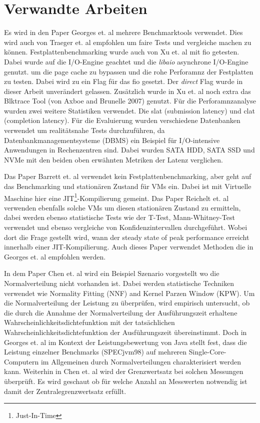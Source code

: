 \chapter{Verwandte Arbeiten}
\label{cha:Verwandte_Arbeiten}

Es wird in den Paper Georges et. al \cite{statistically_rigorous} mehrere Benchmarktools verwendet. 
Dies wird auch von Traeger et. al \cite{nine-year-of-bench} empfohlen um faire Tests und vergleiche machen zu können.
Festplattenbenchmarking wurde auch von Xu et. al \cite{ssd_benchmark} mit fio getesten.
Dabei wurde auf die I/O-Engine geachtet und die \textit{libaio} asynchrone I/O-Engine genutzt.
um die page cache zu bypassen und die rohe Perforamnz der Festplatten zu testen.
Dabei wird zu ein Flag für das fio gesetzt.
Der \textit{direct} Flag wurde in dieser Arbeit unverändert gelassen.
Zusätzlich wurde in Xu et. al \cite{ssd_benchmark} noch extra das Blktrace Tool (von Axboe and Brunelle 2007) genutzt. 
Für die Perforamnzanalyse wurden zwei weitere Statistiken verwendet. Die slat (submission latency) und clat (completion latency).
Für die Evaluierung wurden verschiedene Datenbanken verwendet um realitätsnahe Tests durchzuführen,
da Datenbankmanagementsysteme (DBMS) ein Beispiel für I/O-intensive Anwendungen in Rechenzentren sind.
Dabei wurden SATA HDD, SATA SSD und NVMe mit den beiden oben erwähnten Metriken der Latenz verglichen.

Das Paper Barrett et. al \cite{warmAndCold} verwendet kein Festplattenbenchmarking, aber geht auf das Benchmarking und stationären Zustand für VMs ein.
Dabei ist mit Virtuelle Maschine hier eine JIT\footnote{Just-In-Time}-Kompilierung gemeint.
Das Paper Reichelt et. al \cite{baseline_paper} verwenden ebenfalls solche VMs um diesen stationären Zustand zu ermitteln,
dabei werden ebenso statistische Tests wie der T-Test, Mann-Whitney-Test verwendet und ebenso vergleiche von Konfidenzintervallen durchgeführt. 
Wobei dort die Frage gestellt wird, wann der steady state of peak performance erreicht innerhalb einer JIT-Kompilierung.
Auch dieses Paper verwendet Methoden die in Georges et. al \cite{statistically_rigorous} empfohlen werden.

In dem Paper Chen et. al \cite{statistical_performance_pc} wird ein Beispiel Szenario vorgestellt wo die Normalverteilung nicht vorhanden ist.
Dabei werden statistische Techniken verwendet wie Normality Fitting (NNF) and Kernel Parzen Window (KPW).
Um die Normalverteilung der Leistung zu überprüfen, wird empirisch untersucht, 
ob die durch die Annahme der Normalverteilung der Ausführungszeit erhaltene Wahrscheinlichkeitsdichtefunktion
mit der tatsächlichen Wahrscheinlichkeitsdichtefunktion der Ausführungszeit übereinstimmt.
Doch in Georges et. al \cite{statistically_rigorous} im Kontext der Leistungsbewertung von Java stellt fest, dass die Leistung einzelner Benchmarks (SPECjvm98) 
auf mehreren Single-Core-Computern im Allgemeinen durch Normalverteilungen charakterisiert werden kann.
Weiterhin in Chen et. al wird der Grenzwertsatz bei solchen Messungen überprüft.
Es wird geschaut ob für welche Anzahl an Messwerten notwendig ist damit der Zentralegrenzwertsatz erfüllt.

